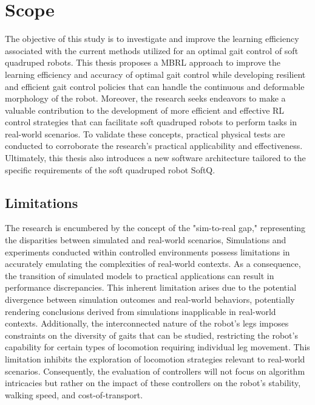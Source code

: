 \section{Scope}
The objective of this study is to investigate and improve the learning efficiency associated with the current methods utilized for an optimal gait control of soft quadruped robots. This thesis proposes a \ac{MBRL} approach to improve the learning efficiency and accuracy of optimal gait control while developing resilient and efficient gait control policies that can handle the continuous and deformable morphology of the robot. Moreover, the research seeks endeavors to make a valuable contribution to the development of more efficient and effective \ac{RL} control strategies that can facilitate soft quadruped robots to perform tasks in real-world scenarios. To validate these concepts, practical physical tests are conducted to corroborate the research's practical applicability and effectiveness. Ultimately, this thesis also introduces a new software architecture tailored to the specific requirements of the  soft quadruped robot SoftQ.

\subsection*{Limitations}
The research is encumbered by the concept of the "sim-to-real gap," representing the disparities between simulated and real-world scenarios, Simulations and experiments conducted within controlled environments possess limitations in accurately emulating the complexities of real-world contexts. As a consequence, the transition of simulated models to practical applications can result in performance discrepancies. This inherent limitation arises due to the potential divergence between simulation outcomes and real-world behaviors, potentially rendering conclusions derived from simulations inapplicable in real-world contexts. Additionally, the interconnected nature of the robot's legs imposes constraints on the diversity of gaits that can be studied, restricting the robot's capability for certain types of locomotion requiring individual leg movement. This limitation inhibits the exploration of locomotion strategies relevant to real-world scenarios. Consequently, the evaluation of controllers will not focus on algorithm intricacies but rather on the impact of these controllers on the robot's stability, walking speed, and cost-of-transport.

